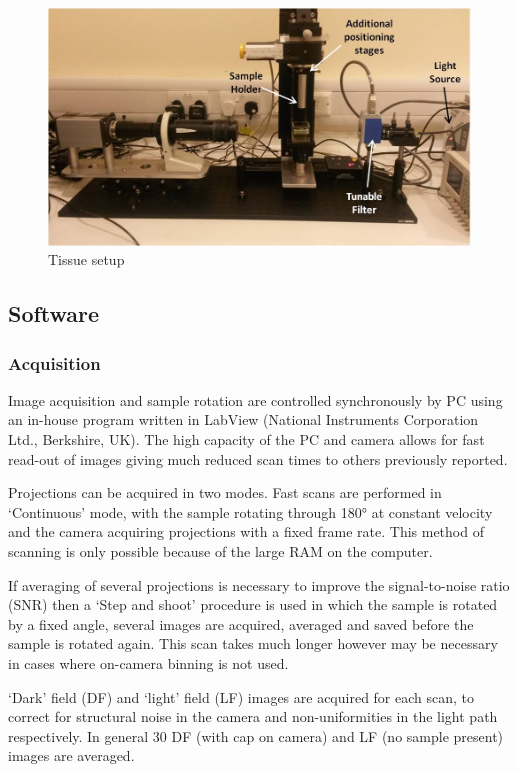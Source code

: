 \begin{figure}
\centering
\includegraphics[width=\linewidth]{meth_img/tissue_setup}
\caption{Tissue setup}
\label{fig:tissue_setup}
\end{figure}





\subsection{Software}
\subsubsection{Acquisition}


Image acquisition and sample rotation are controlled synchronously  by PC using an in-house program written in LabView (National Instruments Corporation Ltd., Berkshire, UK). The high capacity of the PC and camera allows for fast read-out of images giving much reduced scan times to others previously reported. 

Projections can be acquired in two modes. Fast scans are performed in `Continuous' mode, with the sample rotating through \ang{180} at constant velocity and the camera acquiring projections with a fixed frame rate. This method of scanning is only possible because of the large RAM on the computer. 

If averaging of several projections is necessary to improve the signal-to-noise ratio (SNR) then a `Step and shoot' procedure is used in which the sample is rotated by a fixed angle, several images are acquired, averaged and saved before the sample is rotated again. This scan takes much longer however may be necessary in cases where on-camera binning is not used. 


`Dark' field (DF) and `light' field (LF) images are acquired for each scan, to correct for structural noise in the camera and non-uniformities in the light path respectively. In general 30 DF (with cap on camera) and LF (no sample present) images are averaged. 


